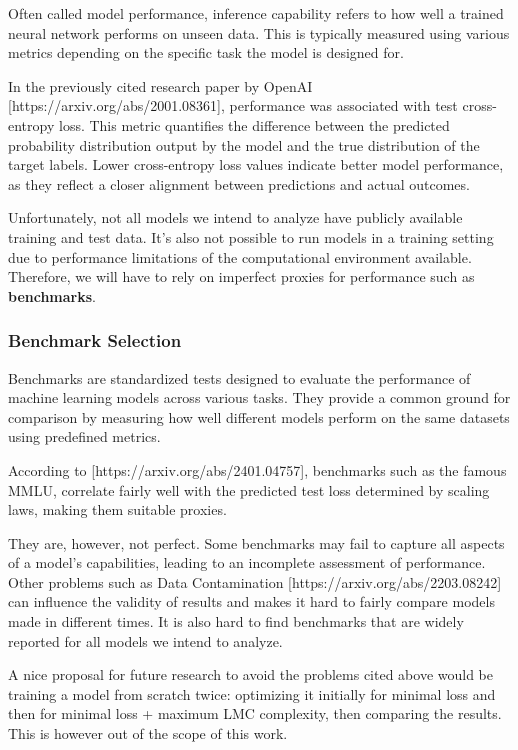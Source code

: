     Often called model performance, inference capability refers to how well a trained neural network performs on unseen data. This is typically measured using various metrics depending on the specific task the model is designed for. 
    
    In the previously cited research paper by OpenAI [https://arxiv.org/abs/2001.08361], performance was associated with test cross-entropy loss. This metric quantifies the difference between the predicted probability distribution output by the model and the true distribution of the target labels. Lower cross-entropy loss values indicate better model performance, as they reflect a closer alignment between predictions and actual outcomes.

    Unfortunately, not all models we intend to analyze have publicly available training and test data. It's also not possible to run models in a training setting due to performance limitations of the computational environment available. Therefore, we will have to rely on imperfect proxies for performance such as \textbf{benchmarks}.

    \subsubsection{Benchmark Selection}
    \label{sec:benchmark_selection}

        Benchmarks are standardized tests designed to evaluate the performance of machine learning models across various tasks. They provide a common ground for comparison by measuring how well different models perform on the same datasets using predefined metrics. 
        
        According to [https://arxiv.org/abs/2401.04757], benchmarks such as the famous MMLU, correlate fairly well with the predicted test loss determined by scaling laws, making them suitable proxies.

        They are, however, not perfect. Some benchmarks may fail to capture all aspects of a model's capabilities, leading to an incomplete assessment of performance. Other problems such as Data Contamination [https://arxiv.org/abs/2203.08242] can influence the validity of results and makes it hard to fairly compare models made in different times. It is also hard to find benchmarks that are widely reported for all models we intend to analyze.

        A nice proposal for future research to avoid the problems cited above would be training a model from scratch twice: optimizing it initially for minimal loss and then for minimal loss + maximum LMC complexity, then comparing the results. This is however out of the scope of this work.


